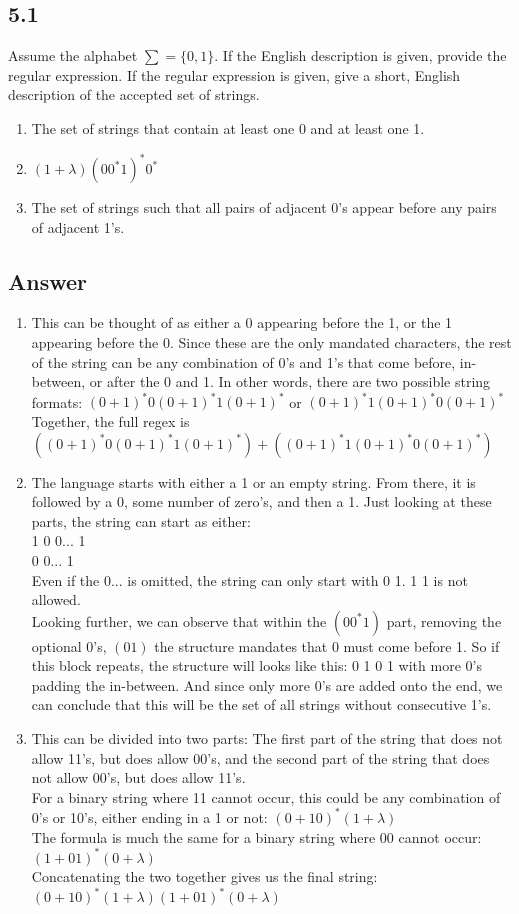 \documentclass{article}
\begin{document}
\subsection*{5.1}
Assume the alphabet $\sum=\{0,1\}$. If the English description is given, provide the regular expression. If the regular expression is given, give a short, English description of the accepted set of strings.
\begin{enumerate}[label=\alph*.]
    \item The set of strings that contain at least one 0 and at least one 1.
    \item $(1+\lambda)(00^*1)^*0^*$
    \item The set of strings such that all pairs of adjacent 0's appear before any pairs of adjacent 1's.
\end{enumerate}
\newpage
\subsection*{Answer}
\begin{enumerate}[label=\alph*.]
    \item This can be thought of as either a 0 appearing before the 1, or the 1 appearing before the 0. Since these are the only mandated characters, the rest of the string can be any combination of 0's and 1's that come before, in-between, or after the 0 and 1. In other words, there are two possible string formats: $(0+1)^*0(0+1)^*1(0+1)^*$ or $(0+1)^*1(0+1)^*0(0+1)^*$
    \\ Together, the full regex is $((0+1)^*0(0+1)^*1(0+1)^*)+((0+1)^*1(0+1)^*0(0+1)^*)$
    \item The language starts with either a 1 or an empty string. From there, it is followed by a 0, some number of zero's, and then a 1. Just looking at these parts, the string can start as either:
    \\ 1 0 0... 1 
    \\ 0 0... 1
    \\ Even if the 0... is omitted, the string can only start with 0 1. 1 1 is not allowed.
    \\ Looking further, we can observe that within the $(00^*1)$ part, removing the optional 0's, $(01)$ the structure mandates that 0 must come before 1. So if this block repeats, the structure will looks like this: 0 1 0 1 with more 0's padding the in-between. And since only more 0's are added onto the end, we can conclude that this will be the set of all strings without consecutive 1's.
    \item This can be divided into two parts: The first part of the string that does not allow 11's, but does allow 00's, and the second part of the string that does not allow 00's, but does allow 11's.
    \\ For a binary string where 11 cannot occur, this could be any combination of 0's or 10's, either ending in a 1 or not: $(0+10)^*(1+\lambda)$
    \\ The formula is much the same for a binary string where 00 cannot occur: $(1+01)^*(0+\lambda)$
    \\ Concatenating the two together gives us the final string: $(0+10)^*(1+\lambda)(1+01)^*(0+\lambda)$
\end{enumerate}
\newpage
\end{document}
